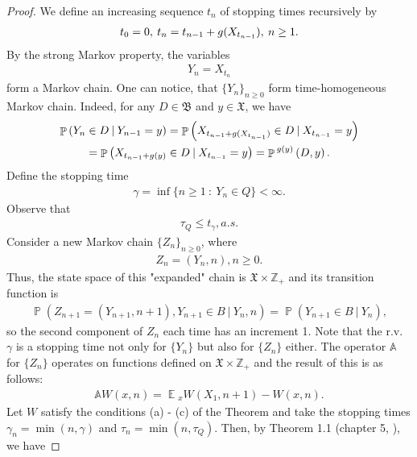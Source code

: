 \documentclass[10pt, reqno]{amsart}
\theoremstyle{definition}
\newcommand{\aasVar}{Q} %
\newcommand{\asaVar}{\mathfrak{B}} %
\newcommand{\astVar}{\tau} %
\newcommand{\wtfVar}{W} %
\newcommand{\atoVar}{\mathbb{A}} %
\newcommand{\assVar}{\mathfrak{X}} %
\newcommand{\integers}{\mathbb{Z}} %
\DeclareMathOperator*{\E}{\mathbb{E}}
\DeclareMathOperator*{\Pb}{\mathbb{P}}
\begin{document}
	\begin{proof}
		We define an increasing sequence $t_{n}$ of stopping times recursively by
		\begin{gather*}
			t_{0} = 0, \: t_{n} = t_{n-1} + g(X_{t_{n-1}}), \: n \geq 1.
		\end{gather*}
		By the strong Markov property, the variables
		\begin{gather*}
			Y_{n} = X_{t_{n}}
		\end{gather*}
		form a Markov chain. One can notice, that $\{Y_{n}\}_{n \geq 0}$ form time-homogeneous Markov chain. Indeed, for any $D \in \asaVar$ and $y \in \assVar$, we have
		\begin{gather*}
			\Pb\left(Y_{n} \in D \: | \: Y_{n-1} = y\right) = \Pb\left(X_{t_{n-1} + \gffVar(X_{t_{n-1}})} \in D \: | \: X_{t_{n-1}} = y\right) \\ = \Pb\left(X_{t_{n-1} + \gffVar(y)} \in D \: | \: X_{t_{n-1}} = y\right) = \Pb{}^{\gffVar(y)}\left(D, y\right).
		\end{gather*}
		Define the stopping time
		\begin{gather*}
			\gamma = \inf\{n \geq 1 \: : \: Y_{n} \in \aasVar\} < \infty.
		\end{gather*}
		Observe that
		\begin{gather*}
			\astVar_{\aasVar} \leq t_{\gamma}, a.s.
		\end{gather*}
		Consider a new Markov chain $\{Z_{n}\}_{n \geq 0}$, where
		\begin{gather*}
			Z_{n} = (Y_{n}, n), n \geq 0.
		\end{gather*}
		Thus, the state space of this "expanded"$ $ chain is $\assVar \times \integers_{+}$ and its transition function is
		\begin{gather*}
			\Pb(Z_{n+1} = (Y_{n+1}, n+1), Y_{n+1} \in B \: | \: Y_{n}, n) = \Pb(Y_{n+1} \in B \: | \: Y_{n}),
		\end{gather*}
		so the second component of $Z_{n}$ each time has an increment 1. Note that the r.v. $\gamma$ is a stopping time not only for $\{Y_{n}\}$ but also for $\{Z_{n}\}$ either. The operator $\atoVar$ for $\{Z_{n}\}$ operates on functions defined on $\assVar \times \integers_{+}$ and the result of this is as follows:
		\begin{gather*}
			\atoVar\wtfVar(x, n) = \E{}_{x}\wtfVar(X_{1}, n+1) - \wtfVar(x, n).
		\end{gather*}
		Let $\wtfVar$ satisfy the conditions (a) - (c) of the Theorem and take the stopping times $\gamma_{n} = \min(n, \gamma)$ and $\astVar_{n} = \min(n, \astVar_{\aasVar})$. Then, by Theorem 1.1 (chapter 5, \cite{Kalashnikov}), we have

\end{proof}
\end{document}
